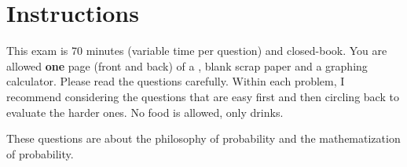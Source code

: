 \documentclass[12pt,landscape]{article}
\begin{document}
\section*{Instructions}
This exam is 70 minutes (variable time per question) and closed-book. You are allowed \textbf{one} page (front and back) of a , blank scrap paper and a graphing calculator. Please read the questions carefully. Within each problem, I recommend considering the questions that are easy first and then circling back to evaluate the harder ones. No food is allowed, only drinks. %

\pagebreak



\problem{} These questions are about the philosophy of probability and the mathematization of probability.
\end{document}
